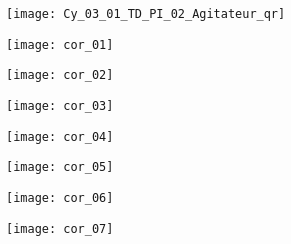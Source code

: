 \ifprof
\else
\begin{marginfigure}
\centering
\texttt{[image: Cy\_03\_01\_TD\_PI\_02\_Agitateur\_qr]}
\end{marginfigure}
\fi

\ifprof
\else
\ifcolle
\else
{}

\fi
\fi



\ifprof
\begin{center}
\texttt{[image: cor\_01]}
\end{center}
\begin{center}
\texttt{[image: cor\_02]}
\end{center}
\begin{center}
\texttt{[image: cor\_03]}
\end{center}
\begin{center}
\texttt{[image: cor\_04]}
\end{center}
\begin{center}
\texttt{[image: cor\_05]}
\end{center}
\begin{center}
\texttt{[image: cor\_06]}
\end{center}
\begin{center}
\texttt{[image: cor\_07]}
\end{center}
\else
\fi
